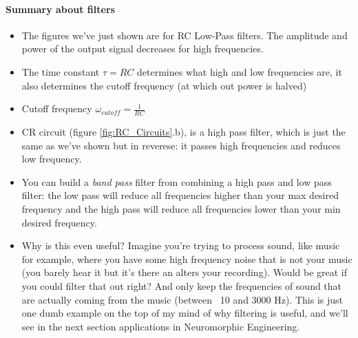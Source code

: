 \paragraph{Summary about filters}
\begin{itemize}
    \item The figures we've just shown are for RC Low-Pass filters. The amplitude and power of the output signal decreases for high frequencies. 
    \item The time constant $\tau = RC$ determines what high and low frequencies are, it also determines the cutoff frequency (at which out power is halved)
    \item Cutoff frequency $\omega_{cutoff} = \frac{1}{RC}$
    \item CR circuit (figure \ref{fig:RC_Circuits}.b), is a high pass filter, which is just the same as we've shown but in reverese: it passes high frequencies and reduces low frequency. 
    \item You can build a \textit{band pass} filter from combining a high pass and low pass filter: the low pass will reduce all frequencies higher than your max desired frequency and the high pass will reduce all frequencies lower than your min desired frequency. 
    \item Why is this even useful? Imagine you're trying to process sound, like music for example, where you have some high frequency noise that is not your music (you barely hear it but it's there an alters your recording). Would be great if you could filter that out right? And only keep the frequencies of sound that are actually coming from the music (between ~10 and 3000 Hz). This is just one dumb example on the top of my mind of why filtering is useful, and we'll see in the next section applications in Neuromorphic Engineering. 
\end{itemize}



